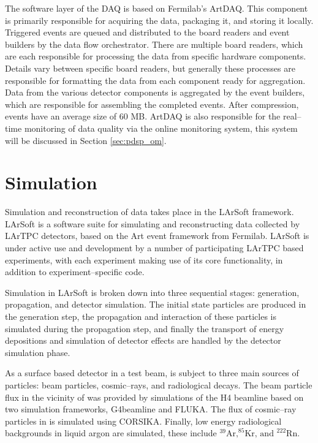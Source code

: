 The software layer of the \protodune{} DAQ is based on Fermilab's 
ArtDAQ\cite{6495515}. This component is primarily responsible for acquiring 
the data, packaging it, and storing it locally. Triggered events are queued 
and distributed to the board readers and event builders by the data flow 
orchestrator. There are multiple board readers, which are each responsible for 
processing the data from specific hardware components. Details vary between 
specific board readers, but generally these processes are responsible for 
formatting the data from each component ready for aggregation. Data from the 
various detector components is aggregated by the event builders, which are 
responsible for assembling the completed events. After compression, events have 
an average size of 60 MB. ArtDAQ is also responsible for the real--time 
monitoring of data quality via the online monitoring system, this system will 
be discussed in Section \ref{sec:pdsp_om}.

\section{Simulation} \label{sec:simulation}

Simulation and reconstruction of \protodune{} data takes place in the LArSoft
framework\cite{Snider2017}. LArSoft is a software suite for simulating and
reconstructing data collected by LArTPC detectors, based on the Art event 
framework from Fermilab\cite{Green:2012gv}. LArSoft is under active use and
development by a number of participating LArTPC based experiments, with each
experiment making use of its core functionality, in addition to 
experiment--specific code. 

Simulation in LArSoft is broken down into three sequential stages: generation,
propagation, and detector simulation. The initial state particles are produced
in the generation step, the propagation and interaction of these particles is 
simulated during the propagation step, and finally the transport of energy 
depositions and simulation of detector effects are handled by the detector 
simulation phase.

As a surface based detector in a test beam, \protodune{} is subject to three
main sources of particles: beam particles, cosmic--rays, and radiological 
decays. The beam particle flux in the vicinity of \protodune{} was provided by 
simulations of the H4 beamline\cite{Booth:2019brj} based on two simulation 
frameworks, G4beamline\cite{g4beamline} and FLUKA\cite{BOHLEN2014211}. The flux
of cosmic--ray particles in \protodune{} is simulated using 
CORSIKA\cite{Heck:1998vt}. Finally, low energy radiological backgrounds in 
liquid argon are simulated, these include $^{39}\mbox{Ar,} ^ {85}\mbox{Kr, and }
^{222}\mbox{Rn}$.

